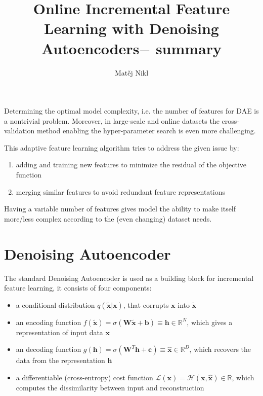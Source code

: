 \documentclass[a4paper,twocolumn]{article}
\title{Online Incremental Feature Learning with Denoising Autoencoders$-$ summary}
\author{Matěj Nikl}
\renewcommand{\H}{\mathcal{H}}
\renewcommand{\L}{\mathcal{L}}
\begin{document}
\maketitle
\noindent
Determining the optimal model complexity, i.e. the number of features for DAE is a nontrivial problem. Moreover, in large-scale and online datasets the cross-validation method enabling the hyper-parameter search is even more challenging.

This adaptive feature learning algorithm tries to address the given issue by:
\begin{enumerate}
    \item adding and training new features to minimize the residual of the objective function
    \item merging similar features to avoid redundant feature representations
\end{enumerate}
Having a variable number of features gives model the ability to make itself more/less complex according to the (even changing) dataset needs.

\section{Denoising Autoencoder}
The standard Denoising Autoencoder is used as a building block for incremental feature learning, it consists of four components:
\begin{itemize}
    \item a conditional distribution $q(\mathbf{\widetilde{x}|x})$, that corrupts $\mathbf{x}$ into $\mathbf{\widetilde{x}}$
    \item an encoding function $f(\mathbf{\widetilde{x}}) = \sigma(\mathbf{W\widetilde{x} + b}) \equiv \mathbf{h} \in \mathbb{R}^N$, which gives a representation of input data $\mathbf{x}$
    \item an decoding function $g(\mathbf{h}) = \sigma(\mathbf{W}^T\mathbf{h + c}) \equiv \mathbf{\widehat{x}} \in \mathbb{R}^D$, which recovers the data from the representation $\mathbf{h}$
    \item a differentiable (cross-entropy) cost function $\L(\mathbf{x}) = \H(\mathbf{x}, \mathbf{\widehat{x}}) \in \mathbb{R}$, which computes the dissimilarity between input and reconstruction
\end{itemize}
\end{document}

